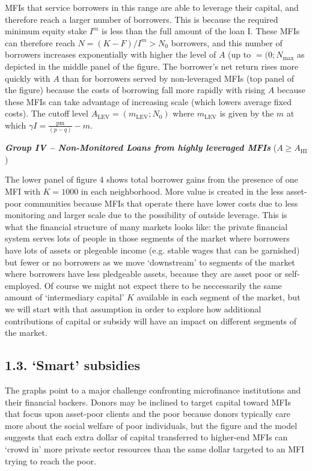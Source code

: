 \documentclass[
]{article}
\begin{document}
MFIs that service borrowers in this range are able to leverage their
capital, and therefore reach a larger number of borrowers. This is
because the required minimum equity stake \(I^{m}\) is less than the
full amount of the loan \(\text{I.}\) These MFIs can therefore reach
\(N = (K - F)/I^{m} > N_{0}\) borrowers, and this number of borrowers
increases exponentially with higher the level of \(A\) (up to
\(= (0;N_{\max}\) as depicted in the middle panel of the figure. The
borrower's net return rises more quickly with \(A\) than for borrowers
served by non-leveraged MFIs (top panel of the figure) because the costs
of borrowing fall more rapidly with rising \(A\) because these MFIs can
take advantage of increasing scale (which lowers average fixed costs).
The cutoff level \(A_{\text{LEV}} = (m_{\text{LEV}};N_{0})\) where
\(m_{\text{LEV}}\) is given by the \(m\) at which
\(\gamma I = \frac{\text{pm}}{(p - q)} - m\).

\emph{\textbf{{Group IV} -- Non-Monitored Loans from highly leveraged
MFIs}} (\(A \geq A_{\text{HI}}\))

The lower panel of figure 4 shows total borrower gains from the presence
of one MFI with \(K = 1000\) in each neighborhood. More value is created
in the less asset-poor communities because MFIs that operate there have
lower costs due to less monitoring and larger scale due to the
possibility of outside leverage. This is what the financial structure of
many markets looks like: the private financial system serves lots of
people in those segments of the market where borrowers have lots of
assets or plegeable income (e.g. stable wages that can be garnished) but
fewer or no borrowers as we move `downstream' to segments of the market
where borrowers have less pledgeable assets, because they are asset poor
or self-employed. Of course we might not expect there to be neccessarily
the same amount of `intermediary capital' \(K\) available in each
segment of the market, but we will start with that assumption in order
to explore how additional contributions of capital or subsidy will have
an impact on different segments of the market.

\hypertarget{smart-subsidies}{%
\subsection{1.3. `Smart' subsidies}\label{smart-subsidies}}

The graphs point to a major challenge confronting microfinance
institutions and their financial backers. Donors may be inclined to
target capital toward MFIs that focus upon asset-poor clients and the
poor because donors typically care more about the social welfare of poor
individuals, but the figure and the model suggests that each extra
dollar of capital transferred to higher-end MFIs can `crowd in' more
private sector resources than the same dollar targeted to an MFI trying
to reach the poor.
\end{document}
